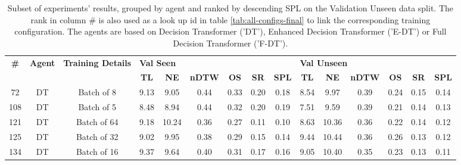 \begin{table}
\centering
\caption{\label{tab:batch_test}Subset of experiments' results, grouped by agent and ranked by descending SPL on the Validation Unseen data split. The rank in column \# is also used as a look up id in table \ref{tab:all-configs-final} to link the corresponding training configuration.     \newline The agents are based on Decision Transformer ('DT'), Enhanced Decision Transformer ('E-DT') or Full Decision Transformer ('F-DT').}
\begin{tabular}{@{\hskip3pt}c@{\hskip3pt}c@{\hskip3pt}c@{\hskip3pt}c@{\hskip3pt}c@{\hskip3pt}c@{\hskip3pt}c@{\hskip3pt}c@{\hskip3pt}c@{\hskip3pt}c@{\hskip3pt}c@{\hskip3pt}c@{\hskip3pt}c@{\hskip3pt}c@{\hskip3pt}c}
\toprule
\textbf{\#} & \textbf{Agent} & \textbf{Training Details} & \multicolumn{6}{l}{\textbf{Val Seen}} & \multicolumn{6}{l}{\textbf{Val Unseen}} \\
 \textbf{~} &     \textbf{~} &                \textbf{~} &       \textbf{TL} & \textbf{NE} & \textbf{nDTW} & \textbf{OS} & \textbf{SR} & \textbf{SPL} &         \textbf{TL} & \textbf{NE} & \textbf{nDTW} & \textbf{OS} & \textbf{SR} & \textbf{SPL} \\
\midrule
         72 &             DT &                Batch of 8 &              9.13 &        9.05 &          0.44 &        0.33 &        0.20 &         0.18 &                8.54 &        9.97 &          0.39 &        0.24 &        0.15 &         0.14 \\
        108 &             DT &                Batch of 5 &              8.48 &        8.94 &          0.44 &        0.32 &        0.20 &         0.19 &                7.51 &        9.59 &          0.39 &        0.21 &        0.14 &         0.13 \\
        121 &             DT &               Batch of 64 &              9.18 &       10.24 &          0.36 &        0.27 &        0.11 &         0.10 &                8.63 &       10.36 &          0.36 &        0.22 &        0.14 &         0.12 \\
        125 &             DT &               Batch of 32 &              9.02 &        9.95 &          0.38 &        0.29 &        0.15 &         0.14 &                9.44 &       10.44 &          0.36 &        0.26 &        0.13 &         0.12 \\
        134 &             DT &               Batch of 16 &              9.37 &        9.64 &          0.40 &        0.31 &        0.17 &         0.16 &                9.05 &       10.40 &          0.35 &        0.23 &        0.13 &         0.11 \\

\end{tabular}
\end{table}
